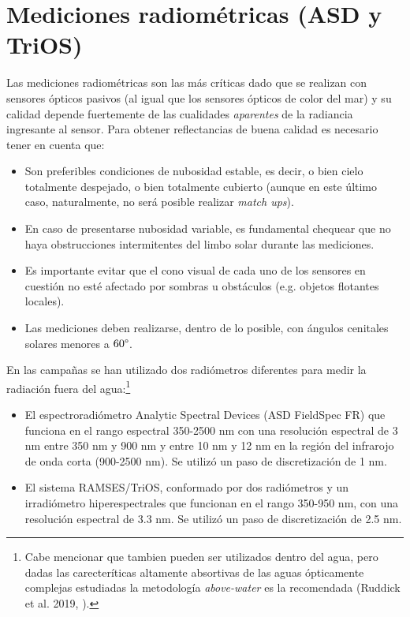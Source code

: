 \section{Mediciones radiométricas (ASD y TriOS)}
\label{dat:s:radiometricas}
    Las mediciones radiométricas son las más críticas dado que se realizan con sensores ópticos pasivos (al igual que los sensores ópticos de color del mar) y su calidad depende fuertemente de las cualidades \textit{aparentes} de la radiancia ingresante al sensor. Para obtener reflectancias de buena calidad es necesario tener en cuenta que:
    \begin{itemize}
        \item Son preferibles condiciones de nubosidad estable, es decir, o bien cielo totalmente despejado, o bien totalmente cubierto (aunque en este último caso, naturalmente, no será posible realizar \textit{match ups}).
        \item En caso de presentarse nubosidad variable, es fundamental chequear que no haya obstrucciones intermitentes del limbo solar durante las mediciones.
        \item Es importante evitar que el cono visual de cada uno de los sensores en cuestión no esté afectado por sombras u obstáculos (e.g. objetos flotantes locales).
        \item Las mediciones deben realizarse, dentro de lo posible, con ángulos cenitales solares menores a $60 \degree$.
    \end{itemize}
    
    En las campañas se  han utilizado dos radiómetros diferentes para medir la radiación fuera del agua:\footnote{Cabe mencionar que tambien pueden ser utilizados dentro del agua, pero dadas las carecteríticas altamente absortivas de las aguas ópticamente complejas estudiadas la metodología \textit{above-water} es la recomendada (Ruddick et al. 2019, \cite{ruddick2019}).}
    \begin{itemize}
        \item El espectroradiómetro Analytic Spectral Devices (ASD FieldSpec FR) que funciona en el rango espectral 350-2500 nm con una resolución espectral de 3 nm entre 350 nm y 900 nm y entre 10 nm y 12 nm en la región del infrarojo de onda corta (900-2500 nm). Se utilizó un paso de discretización de 1 nm.
        \item El sistema RAMSES/TriOS, conformado por dos radiómetros y un irradiómetro hiperespectrales que funcionan en el rango 350-950 nm, con una resolución espectral de 3.3 nm. Se utilizó un paso de discretización de 2.5 nm.
    \end{itemize}
    
